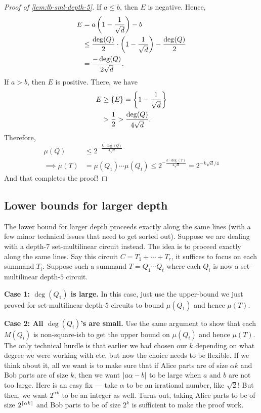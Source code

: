 \begin{proof}[Proof of \autoref{lem:lb-sml-depth-5}]
  \noindent
  If $a \leq b$, then $E$ is negative. Hence,
  \begin{align*}
    E & =  a\left(1 - \frac{1}{\sqrt{d}}\right) - b\\
      & \leq \frac{\deg(Q)}{2} \cdot \left(1 - \frac{1}{\sqrt{d}}\right) - \frac{\deg(Q)}{2}\\
      & = \frac{-\deg(Q)}{2\sqrt{d}}.
  \end{align*}
  If $a > b$, then $E$ is positive. There, we have
  \begin{align*}
    E & \geq \{E\} = \left\{1 - \frac{1}{\sqrt{d}}\right\}\\
      & > \frac{1}{2} > \frac{\deg(Q)}{4\sqrt{d}}.
  \end{align*}
  Therefore,
  \begin{align*}
    \mu(Q) & \leq 2^{- \frac{k \cdot \deg(Q)}{4\sqrt{d}}}\\
    \implies \mu(T) & = \mu(Q_1)\cdots \mu(Q_t) \leq 2^{-\frac{k \cdot \deg(T)}{4\sqrt{d}}} = 2^{-k\sqrt{d}/4}
  \end{align*}
  And that completes the proof!  
\end{proof}


\subsection{Lower bounds for larger depth}

The lower bound for larger depth proceeds exactly along the same lines (with a few minor technical issues that need to get sorted out). Suppose we are dealing with a depth-$7$ set-multilinear circuit instead. The idea is to proceed exactly along the same lines. Say this circuit $C = T_1 + \cdots + T_r$, it suffices to focus on each summand $T_i$. Suppose such a summand $T = Q_1 \cdots Q_t$ where each $Q_i$ is now a set-multilinear depth-$5$ circuit.

{\bf Case 1: $\deg(Q_1)$ is large.} In this case, just use the upper-bound we just proved for set-multilinear depth-$5$ circuits to bound $\mu(Q_1)$ and hence $\mu(T)$.

\medskip

{\bf Case 2: All $\deg(Q_i)$'s are small.} Use the same argument to show that each $M(Q_i)$ is non-square-ish to get the upper bound on $\mu(Q_i)$ and hence $\mu(T)$.\\

The only technical hurdle is that earlier we had chosen our $k$ depending on what degree we were working with etc. but now the choice needs to be flexible. If we think about it, all we want is to make sure that if Alice parts are of size $\alpha k$ and Bob parts are of size $k$, then we want $\left|a\alpha - b\right|$ to be large when $a$ and $b$ are not too large. Here is an easy fix --- take $\alpha$ to be an irrational number, like $\sqrt{2}$! But then, we want $2^{\alpha k}$ to be an integer as well. Turns out, taking Alice parts to be of size $2^{\lceil \alpha k \rceil}$ and Bob parts to be of size $2^{k}$ is sufficient to make the proof work. 

